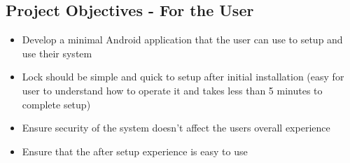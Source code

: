 \subsection{Project Objectives - For the User}
\begin{itemize}
	\item Develop a minimal Android application that the user can use to setup and use their system
	\item Lock should be simple and quick to setup after initial installation (easy for user to understand how to operate it and takes less than 5 minutes to complete setup)
	\item Ensure security of the system doesn't affect the users overall experience
	\item Ensure that the after setup experience is easy to use
\end{itemize}